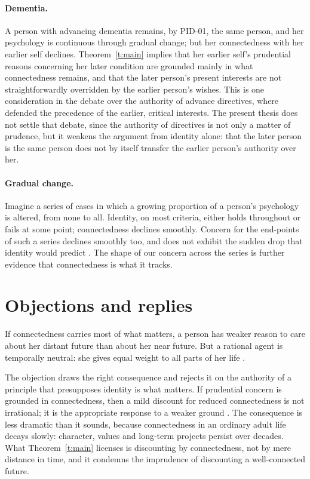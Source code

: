 \documentclass{situationist-preprint}
\begin{document}
\paragraph{Dementia.} A person with advancing dementia remains, by PID-01, the same person, and her psychology is continuous through gradual change; but her connectedness with her earlier self declines. Theorem~\ref{t:main} implies that her earlier self's prudential reasons concerning her later condition are grounded mainly in what connectedness remains, and that the later person's present interests are not straightforwardly overridden by the earlier person's wishes. This is one consideration in the debate over the authority of advance directives, where \citet{Dworkin1993} defended the precedence of the earlier, critical interests. The present thesis does not settle that debate, since the authority of directives is not only a matter of prudence, but it weakens the argument from identity alone: that the later person is the same person does not by itself transfer the earlier person's authority over her.

\paragraph{Gradual change.} Imagine a series of cases in which a growing proportion of a person's psychology is altered, from none to all. Identity, on most criteria, either holds throughout or fails at some point; connectedness declines smoothly. Concern for the end-points of such a series declines smoothly too, and does not exhibit the sudden drop that identity would predict \citep{Parfit1984}. The shape of our concern across the series is further evidence that connectedness is what it tracks.

\section{Objections and replies}\label{s:obj}

\begin{objection}
If connectedness carries most of what matters, a person has weaker reason to care about her distant future than about her near future. But a rational agent is temporally neutral: she gives equal weight to all parts of her life \citep{Sidgwick1907}.
\end{objection}

\begin{reply}
The objection draws the right consequence and rejects it on the authority of a principle that presupposes identity is what matters. If prudential concern is grounded in connectedness, then a mild discount for reduced connectedness is not irrational; it is the appropriate response to a weaker ground \citep{Parfit1984}. The consequence is less dramatic than it sounds, because connectedness in an ordinary adult life decays slowly: character, values and long-term projects persist over decades. What Theorem~\ref{t:main} licenses is discounting by connectedness, not by mere distance in time, and it condemns the imprudence of discounting a well-connected future.
\end{reply}
\end{document}

